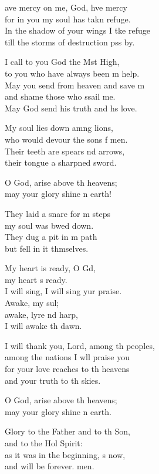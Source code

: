 \begin{psalmverse}
  \begin{patverse}
    ave mercy on me, God, hve mercy\Med\\
for in you my soul has takn refuge.\\
In the shadow of your wings I tke refuge\Med\\
till the storms of destruction pss by.

I call to you God the Mst High,\Med\\
to you who have always been m help.\\
May you send from heaven and save m\Flex\\
and shame those who ssail me.\Med\\
May God send his truth and h\pointup{\i}s love.

My soul lies down amng lions,\Med\\
who would devour the sons f men.\\
Their teeth are spears nd arrows,\Med\\
their tongue a sharpned sword.

O God, arise above th heavens;\Med\\
may your glory shine n earth!

They laid a snare for m steps\Med\\
my soul was bwed down.\\
They dug a pit in m path\Med\\
but fell in it thmselves.

My heart is ready, O Gd,\Flex\\
my heart \pointup{\i}s ready.\Med\\
I will sing, I will sing yur praise.\\
Awake, my sul;\Flex\\
awake, lyre nd harp,\Med\\
I will awake th dawn.

I will thank you, Lord, among th peoples,\Med\\
among the nations I w\pointup{\i}ll praise you\\
for your love reaches to th heavens\Med\\
and your truth to th skies.

O God, arise above th heavens;\Med\\
may your glory shine n earth.

Glory to the Father and to th Son,\Med\\
and to the Hol Spirit:\\
as it was in the beginning, \pointup{\i}s now,\Med\\
and will be forever. men. 
  \end{patverse}
\end{psalmverse}
